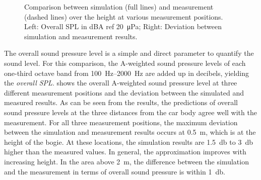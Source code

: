 \begin{figure}
\begin{subfigure}[b]{0.49\textwidth}
	\end{subfigure}
	\caption{Comparison between simulation (full lines) and measurement (dashed lines) over the height at various measurement positions. Left: Overall SPL in dBA ref \SI{20}{\micro\pascal}; Right: Deviation between simulation and measurement results.}
	\label{fig:overall_SPL}
\end{figure}
The overall sound pressure level is a simple and direct parameter to quantify the sound level. 
For this comparison, the A-weighted sound pressure levels of each one-third octave band from \SIrange{100}{2000}{\hertz} are added up in decibels, yielding the \emph{overall SPL}. 
 shows the overall A-weighted sound pressure level at three different measurement positions and the deviation between the simulated and measured results. As can be seen from the results, the predictions of overall sound pressure levels at the three distances from the car body agree well with the measurement. For all three measurement positions, the maximum deviation between the simulation and measurement results occurs at \SI{0.5}{\meter}, which is at the height of the bogie. At these locations, the simulation results are \SI{1.5}{\decibel} to \SI{3}{\decibel} higher than the measured values. In general, the approximation improves with increasing height. In the area above \SI{2}{\meter}, the difference between the simulation and the measurement in terms of overall sound pressure is within \SI{1}{\decibel}.

